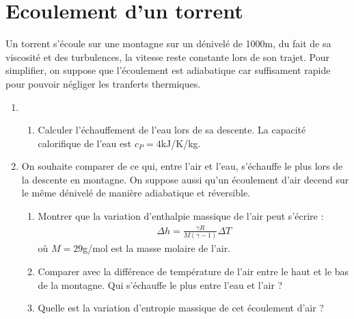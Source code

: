 \newpage

\section{Ecoulement d'un torrent}

Un torrent s'écoule sur une montagne sur un dénivelé de 1000m, du fait de sa viscosité et des turbulences, la vitesse reste constante lors de son trajet. Pour simplifier, on suppose que l'écoulement est adiabatique car suffisament rapide pour pouvoir négliger les tranferts thermiques. 

\begin{enumerate}

\item

\begin{enumerate}

	\item Calculer l'échauffement de l'eau lors de sa descente. La capacité calorifique de l'eau est $c_P=4$kJ/K/kg. 
	
\end{enumerate}

\item On souhaite comparer de ce qui, entre l'air et l'eau, s'échauffe le plus lors de la descente en montagne. On suppose aussi qu'un écoulement d'air decend sur le même dénivelé de manière adiabatique et réversible. 

\begin{enumerate}

	\item Montrer que la variation d'enthalpie massique de l'air peut s'écrire :
	\begin{align*}
		\Delta h =\frac{\gamma R}{M(\gamma -1)}\Delta T
	\end{align*}
	où $M=29$g/mol est la masse molaire de l'air.

	\item Comparer avec la différence de température de l'air entre le haut et le bas de la montagne. Qui s'échauffe le plus entre l'eau et l'air ?
	
	\item Quelle est la variation d'entropie massique de cet écoulement d'air ? 
	
\end{enumerate}

\end{enumerate}

\newpage

